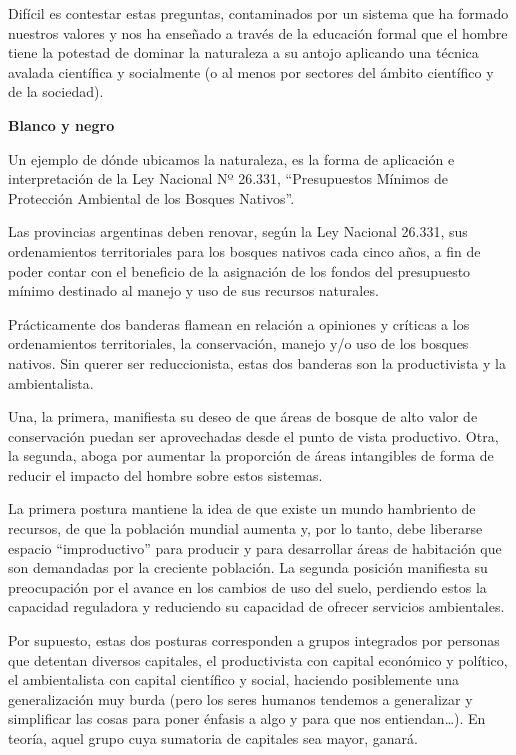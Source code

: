 \begin{fullwidth}
Difícil es contestar estas preguntas, contaminados por un sistema que ha
formado nuestros valores y nos ha enseñado a través de la educación
formal que el hombre tiene la potestad de dominar la naturaleza a su
antojo aplicando una técnica avalada científica y socialmente (o al
menos por sectores del ámbito científico y de la sociedad).

\textbf{Blanco y negro}

Un ejemplo de dónde ubicamos la naturaleza, es la forma de aplicación e
interpretación de la Ley Nacional Nº 26.331, ``Presupuestos Mínimos de
Protección Ambiental de los Bosques Nativos''.

Las provincias argentinas deben renovar, según la Ley Nacional 26.331,
sus ordenamientos territoriales para los bosques nativos cada cinco
años, a fin de poder contar con el beneficio de la asignación de los
fondos del presupuesto mínimo destinado al manejo y uso de sus recursos
naturales.

Prácticamente dos banderas flamean en relación a opiniones y críticas a
los ordenamientos territoriales, la conservación, manejo y/o uso de los
bosques nativos. Sin querer ser reduccionista, estas dos banderas son la
productivista y la ambientalista.

Una, la primera, manifiesta su deseo de que áreas de bosque de alto
valor de conservación puedan ser aprovechadas desde el punto de vista
productivo. Otra, la segunda, aboga por aumentar la proporción de áreas
intangibles de forma de reducir el impacto del hombre sobre estos
sistemas.

La primera postura mantiene la idea de que existe un mundo hambriento de
recursos, de que la población mundial aumenta y, por lo tanto, debe
liberarse espacio ``improductivo'' para producir y para desarrollar
áreas de habitación que son demandadas por la creciente población. La
segunda posición manifiesta su preocupación por el avance en los cambios
de uso del suelo, perdiendo estos la capacidad reguladora y reduciendo
su capacidad de ofrecer servicios ambientales.

Por supuesto, estas dos posturas corresponden a grupos integrados por
personas que detentan diversos capitales, el productivista con capital
económico y político, el ambientalista con capital científico y social,
haciendo posiblemente una generalización muy burda (pero los seres
humanos tendemos a generalizar y simplificar las cosas para poner
énfasis a algo y para que nos entiendan\ldots{}). En teoría, aquel grupo
cuya sumatoria de capitales sea mayor, ganará.


\end{fullwidth}
